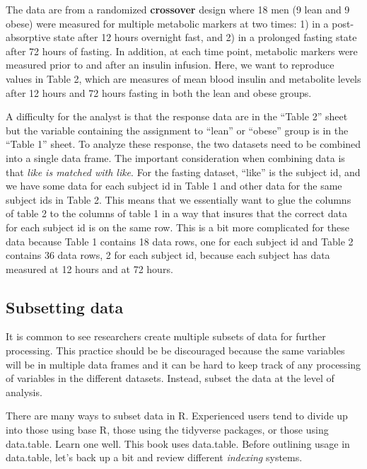 \documentclass[]{book}
\begin{document}
The data are from a randomized \textbf{crossover} design where 18 men (9 lean and 9 obese) were measured for multiple metabolic markers at two times: 1) in a post-absorptive state after 12 hours overnight fast, and 2) in a prolonged fasting state after 72 hours of fasting. In addition, at each time point, metabolic markers were measured prior to and after an insulin infusion. Here, we want to reproduce values in Table 2, which are measures of mean blood insulin and metabolite levels after 12 hours and 72 hours fasting in both the lean and obese groups.

A difficulty for the analyst is that the response data are in the ``Table 2'' sheet but the variable containing the assignment to ``lean'' or ``obese'' group is in the ``Table 1'' sheet. To analyze these response, the two datasets need to be combined into a single data frame. The important consideration when combining data is that \emph{like is matched with like}. For the fasting dataset, ``like'' is the subject id, and we have some data for each subject id in Table 1 and other data for the same subject ids in Table 2. This means that we essentially want to glue the columns of table 2 to the columns of table 1 in a way that insures that the correct data for each subject id is on the same row. This is a bit more complicated for these data because Table 1 contains 18 data rows, one for each subject id and Table 2 contains 36 data rows, 2 for each subject id, because each subject has data measured at 12 hours and at 72 hours.

\hypertarget{subsetting-data}{%
\subsection{Subsetting data}\label{subsetting-data}}

It is common to see researchers create multiple subsets of data for further processing. This practice should be be discouraged because the same variables will be in multiple data frames and it can be hard to keep track of any processing of variables in the different datasets. Instead, subset the data at the level of analysis.

There are many ways to subset data in R. Experienced users tend to divide up into those using base R, those using the tidyverse packages, or those using data.table. Learn one well. This book uses data.table. Before outlining usage in data.table, let's back up a bit and review different \emph{indexing} systems.
\end{document}
